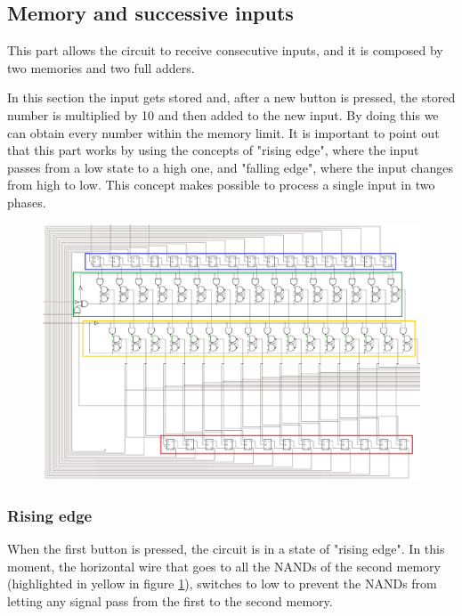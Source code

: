 \documentclass{article}
\begin{document}
\subsection{Memory and successive inputs}

This part allows the circuit to receive consecutive inputs, and it is composed by two memories and two full adders. 

\vspace{3mm}

In this section the input gets stored and, after a new button is pressed, the stored number is multiplied by 10 and then added to the new input. By doing this we can obtain every number within the memory limit.
\clearpage
It is important to point out that this part works by using the concepts of "rising edge", where the input passes from a low state to a high one, and "falling edge", where the input changes from high to low. This concept makes possible to process a single input in two phases.

\begin{figure}[h]
    \centering
    \includegraphics[scale=.55]{IM_Converter.PNG}
    \caption{}
    \label{Converter}
\end{figure}


\subsubsection{Rising edge}

When the first button is pressed, the circuit is in a state of "rising edge". In this moment, the horizontal wire that goes to all the NANDs of the second memory (highlighted in yellow in figure \ref{Converter}), switches to low to prevent the NANDs from letting any signal pass from the first to the second memory.
\end{document}
